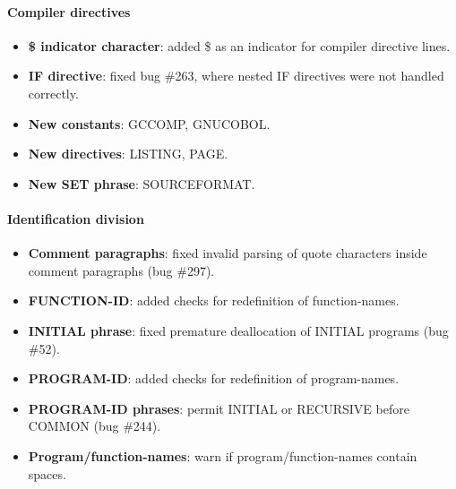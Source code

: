 \paragraph{Compiler directives}
\begin{itemize}
\item \textbf{\$ indicator character}: added \$ as an indicator for compiler directive lines.
\item \textbf{\directiveindicator{}IF directive}: fixed bug \#263, where nested \directiveindicator{}IF directives were not handled correctly.
\item \textbf{New constants}: GCCOMP, GNUCOBOL.
\item \textbf{New directives}: \directiveindicator{}LISTING, \directiveindicator{}PAGE.
\item \textbf{New \directiveindicator{}SET phrase}: SOURCEFORMAT.
\end{itemize}

\paragraph{Identification division}
\begin{itemize}
\item \textbf{Comment paragraphs}: fixed invalid parsing of quote characters inside comment paragraphs (bug \#297).
\item \textbf{FUNCTION-ID}: added checks for redefinition of function-names.
\item \textbf{INITIAL phrase}: fixed premature deallocation of INITIAL programs (bug \#52).
\item \textbf{PROGRAM-ID}: added checks for redefinition of program-names.
\item \textbf{PROGRAM-ID phrases}: permit INITIAL or RECURSIVE before COMMON (bug \#244).
\item \textbf{Program\slash{}function-names}: warn if program\slash{}function-names contain spaces.
\end{itemize}

